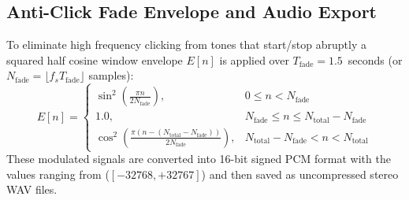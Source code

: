 \documentclass[12pt, a4paper]{report}
\begin{document}
\subsection{Anti-Click Fade Envelope and Audio Export}
To eliminate high frequency clicking from tones that start/stop abruptly a squared half cosine window envelope $E[n]$ is applied over $T_{\text{fade}} = 1.5$~seconds (or $N_{\text{fade}} = \lfloor f_s T_{\text{fade}} \rfloor$ samples):
\begin{equation}
    E[n] = 
    \begin{cases}
        \sin^2\left(\frac{\pi n}{2 N_{\text{fade}}}\right), & 0 \le n < N_{\text{fade}} \\[1ex]
        1.0, & N_{\text{fade}} \le n \le N_{\text{total}} - N_{\text{fade}} \\[1ex]
        \cos^2\left(\frac{\pi (n - (N_{\text{total}} - N_{\text{fade}}))}{2 N_{\text{fade}}}\right), & N_{\text{total}} - N_{\text{fade}} < n < N_{\text{total}}
    \end{cases}
    \label{eq:fade_envelope}
\end{equation}
These modulated signals are converted   into 16-bit signed PCM format with the values ranging from ($[-32768, +32767]$) and then saved as uncompressed stereo WAV files.
\end{document}
